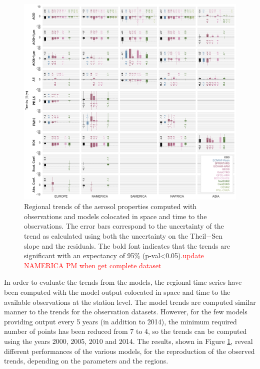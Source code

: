 \documentclass[journal abbreviation, manuscript]{copernicus}
\begin{document}
\begin{figure}[t]
 \includegraphics[width=16cm]{../scripts/figs/heatmaps/BARS.png}
 \caption{Regional trends of the aerosol properties computed with observations and models colocated in space and time to the observations. The error bars correspond to the uncertainty of the trend as calculated using both the uncertainty on the Theil−Sen slope and the residuals. The bold font indicates that the trends are significant with an expectancy of 95\% (p-val<0.05).\textcolor{red}{update NAMERICA PM when get complete dataset}}
 \label{fig:bars}
\end{figure}

In order to evaluate the trends from the models, the regional time series have been computed with the model output colocated in space and time to the available observations at the station level. The model trends are computed similar manner to the trends for the observation datasets. However, for the few models providing output every 5 years (in addition to 2014), the minimum required number of points has been reduced from 7 to 4, so the trends can be computed using the years 2000, 2005, 2010 and 2014. The results, shown in Figure \ref{fig:bars}, reveal different performances of the various models, for the reproduction of the observed trends, depending on the parameters and the regions.
\end{document}
